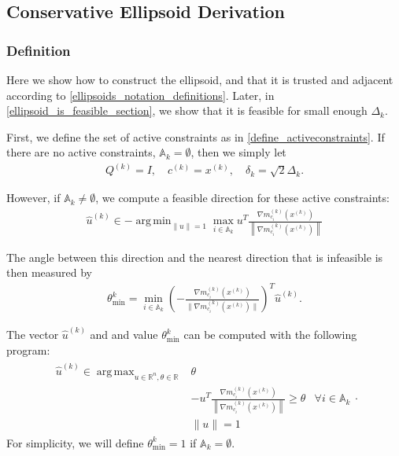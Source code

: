 \documentclass{article}
\theoremstyle{case}
\numberwithin{theorem}{subsection}
\DeclareMathOperator*{\argmin}{arg\,min}
\DeclareMathOperator*{\argmax}{arg\,max}
\newcommand{\activeconstraintsk}{{\mathbb A_{k}}}
\newcommand{\ck}{{c^{(k)}}}
\newcommand{\dk}{\Delta_k}
\newcommand{\gmcik}{{\nabla m_{c_i}^{(k)}\left(\xk\right)}}
\newcommand{\hgik}{{\frac{\nabla m^{(k)}_{c_i}(\xk)}{\|\nabla m^{(k)}_{c_i}(\xk)\|}}}
\newcommand{\huk}{{{\hat u}^{(k)}}}
\newcommand{\qk}{{Q^{(k)}}}
\newcommand{\reals}{\mathbb R}
\newcommand{\Rn}{\mathbb R^n}
\newcommand{\sdk}{{\delta_k}}
\newcommand{\thetamink}{{\theta^k_{\textrm{min}}}}
\newcommand{\xk}{{x^{(k)}}}
\begin{document}
\subsection{Conservative Ellipsoid Derivation}
\label{conservative_ellipsoid_section}
\subsubsection{Definition}

Here we show how to construct the ellipsoid, and that it is 
trusted and adjacent
according to \cref{ellipsoids_notation_definitions}.
Later, in \cref{ellipsoid_is_feasible_section}, we show that it is feasible for small enough $\dk$.

First, we define the set of active constraints as in \cref{define_activeconstraints}.
If there are no active constraints, $\activeconstraintsk = \emptyset$, then we simply let
\begin{align}
\qk = I, \quad \ck = \xk, \quad \sdk = \sqrt{2} \dk. \label{define_trivial_ellipsek}
\end{align}

However, if $\activeconstraintsk \ne \emptyset$, we compute a feasible direction for these active constraints:
\begin{align}
\huk \in -\argmin_{\|u\| = 1} \max_{i \in \activeconstraintsk} u^T \frac{\gmcik}{\left\|\gmcik\right\|} \label{define_u}
\end{align}


The angle between this direction and the nearest direction that is infeasible is then measured by
\begin{align}
\thetamink = \min_{i \in \activeconstraintsk} \left(-\hgik\right)^T \huk \label{define_thetamink}.
\end{align}

The vector $\huk$ and and value $\thetamink$ can be computed with the following program:
\begin{align*}
\begin{array}{ccc}
\huk \in \argmax_{u\in\Rn, \theta\in\reals} & \theta \\
& -u^T \frac{\gmcik}{\left\|\gmcik\right\|} \ge \theta & \forall i \in \activeconstraintsk \\
& \|u \| = 1& 
\end{array}.
\end{align*}
For simplicity, we will define $\thetamink = 1$ if $\activeconstraintsk = \emptyset$.
\end{document}
